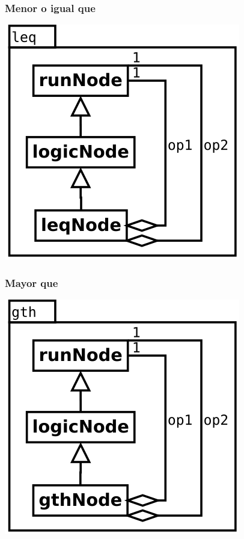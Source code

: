 \subsubsection {Menor o igual que}
\begin{center}
\includegraphics[scale=0.4]{leq.png} \\
\end{center}

\subsubsection {Mayor que}
\begin{center}
\includegraphics[scale=0.4]{gth.png} \\
\end{center}

